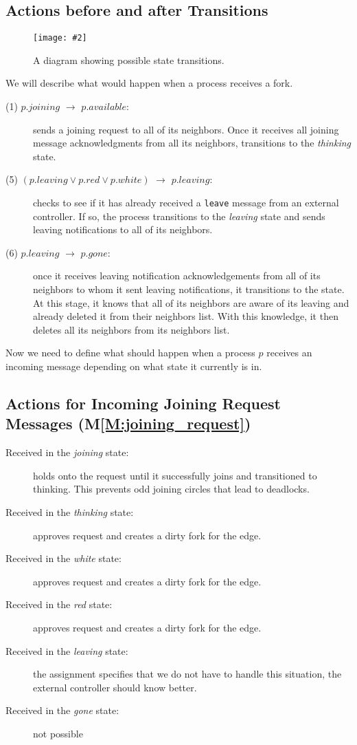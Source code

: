\documentclass[11pt]{article}
\newcommand{\pic}[2]{\begin{center}\texttt{[image: \#2]}\end{center}}
\begin{document}
\subsection{Actions before and after Transitions}
\begin{figure}[H]
\pic{0.6}{diagram}
\label{fig:diagram}
\caption{A diagram showing possible state transitions.}
\end{figure}

We will describe what would happen when a process receives a fork.


\begin{description}
\item[(1) $p.joining$ $\to$ $p.available$:] sends a joining request to all of its neighbors. Once it receives all joining message acknowledgments from all its neighbors, transitions to the \textit{thinking} state.

\item[(5) $(p.leaving \vee p.red \vee p.white)$ $\to$ $p.leaving$:] checks to see if it has already received a \texttt{leave} message from an external controller. If so, the process transitions to the \textit{leaving} state and sends leaving notifications to all of its neighbors. 

\item[(6) $p.leaving$ $\to$ $p.gone$:]
once it receives leaving notification acknowledgements from all of its neighbors to whom it sent leaving notifications, it transitions to the \gone state. At this stage, it knows that all of its neighbors are aware of its leaving and already deleted it from their neighbors list. With this knowledge, it then deletes all its neighbors from its neighbors list.
\end{description}

Now we need to define what should happen when a process $p$ receives an incoming message depending on what state it currently is in.

\subsection{Actions for Incoming Joining Request Messages (M\ref{M:joining_request})}
\begin{description}
\item[Received in the \textit{joining} state:] holds onto the request until it successfully joins and transitioned to thinking. This prevents odd joining circles that lead to deadlocks.
\item[Received in the \textit{thinking} state:] approves request and creates a dirty fork for the edge.
\item[Received in the \textit{white} state:] approves request and creates a dirty fork for the edge.
\item[Received in the \textit{red} state:] approves request and creates a dirty fork for the edge.
\item[Received in the \textit{leaving} state:] the assignment specifies that we do not have to handle this situation, the external controller should know better.
\item[Received in the \textit{gone} state:] not possible
\end{description}
\end{document}
